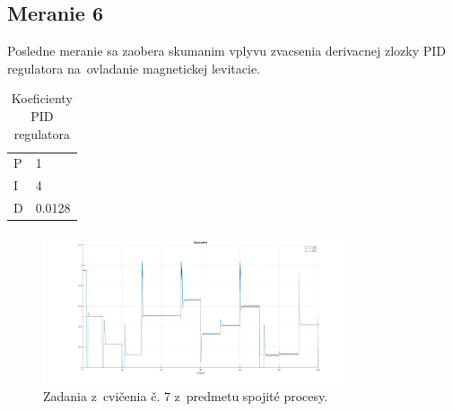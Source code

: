 \documentclass{article}
\begin{document}
\subsection{Meranie 6}
\label{sec:meranie6}


Posledne meranie sa zaobera skumanim vplyvu zvacsenia derivacnej zlozky PID regulatora na~ovladanie magnetickej levitacie.



\begin{table}[!htbp]
	\caption{Koeficienty PID regulatora}
	\label{tab:t6}
	\begin{center}
		\begin{tabular}[c]{|l|l|}
			\hline
			P & 1 \\
			I & 4 \\
			D & 0.0128 \\
			\hline
		\end{tabular}
	\end{center}
\end{table}

\begin{figure}[!htbp]
	\begin{center}
		\includegraphics[width=0.8\textwidth]{./include/m6.png}
	\end{center}
	\caption{Zadania z~cvičenia č. 7 z~predmetu spojité procesy.}
	\label{fig:meranie6}
\end{figure}
\end{document}
